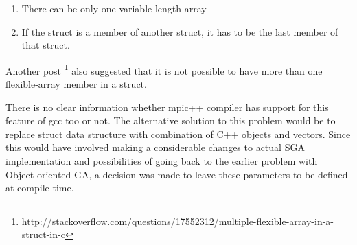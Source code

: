 \begin{enumerate}
	\item There can be only one variable-length array
	\item If the struct is a member of another struct, it has to be the last member of that struct.
\end{enumerate}

Another post \footnote{http://stackoverflow.com/questions/17552312/multiple-flexible-array-in-a-struct-in-c} also suggested that it is not possible to have more than one flexible-array member in a struct.

There is no clear information whether mpic++ compiler has support for this feature of gcc too or not. The alternative solution to this problem would be to replace struct data structure with combination of C++ objects and vectors. Since this would have involved making a considerable changes to actual SGA implementation and possibilities of going back to the earlier problem with Object-oriented GA, a decision was made to leave these parameters to be defined at compile time.
